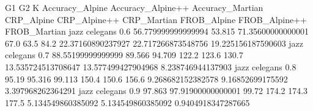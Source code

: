 G1 G2 K Accuracy_Alpine Accuracy_Alpine++ Accuracy_Martian CRP_Alpine CRP_Alpine++ CRP_Martian FROB_Alpine FROB_Alpine++ FROB_Martian
jazz celegans 0.6 56.779999999999994 53.815 71.35600000000001 67.0 63.5 84.2 22.37160890237927 22.717266873548756 19.225156187590603
jazz celegans 0.7 88.55199999999999 89.566 94.709 122.2 123.6 130.7 13.535724513708647 13.577499427904968 8.238746944137903
jazz celegans 0.8 95.19 95.316 99.113 150.4 150.6 156.6 9.268682152382578 9.16852699175592 3.397968262364291
jazz celegans 0.9 97.863 97.91900000000001 99.72 174.2 174.3 177.5 5.134549860385092 5.134549860385092 0.9404918347287665
